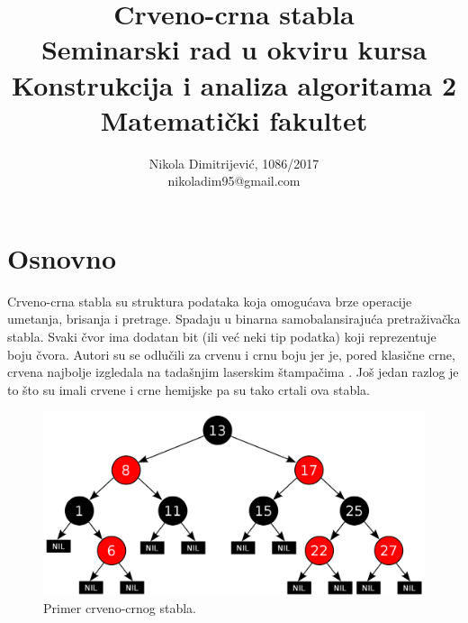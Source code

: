\documentclass[a4paper]{article}
\begin{document}
\title{Crveno-crna stabla\\ \small{Seminarski rad u okviru kursa\\Konstrukcija i analiza algoritama 2\\ Matematički fakultet}}

\author{Nikola Dimitrijević, 1086/2017\\ nikoladim95@gmail.com}
\maketitle


\tableofcontents

\newpage

\section{Osnovno}
\label{sec:uvod}
Crveno-crna stabla su struktura podataka koja omogućava brze operacije umetanja, brisanja i pretrage. Spadaju u binarna samobalansirajuća pretraživačka stabla.
Svaki čvor ima dodatan bit (ili već neki tip podatka) koji reprezentuje boju čvora. Autori su se odlučili za crvenu i crnu boju jer je, pored klasične crne,
crvena najbolje izgledala na tadašnjim laserskim štampačima \cite{funfact}. Još jedan razlog je to što su imali crvene i crne hemijske pa su tako crtali ova stabla.

\begin{figure}[h!]
\begin{center}
\includegraphics[scale=0.2]{example.png}
\end{center}
\caption{Primer crveno-crnog stabla.}
\label{fig:primer}
\end{figure}
\end{document}
